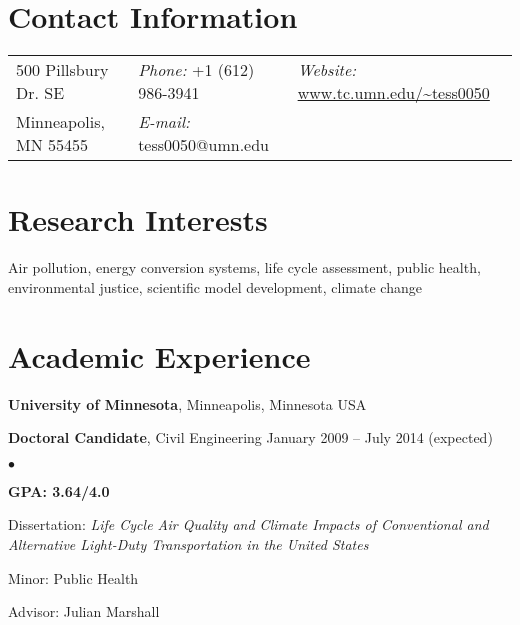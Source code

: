 \documentclass[margin,line]{res}
\newenvironment{list1}{
  \begin{list}{\ding{113}}{%
      \setlength{\itemsep}{0in}
      \setlength{\parsep}{0in} \setlength{\parskip}{0in}
      \setlength{\topsep}{0in} \setlength{\partopsep}{0in} 
      \setlength{\leftmargin}{0.17in}}}{\end{list}}
\newenvironment{list2}{
  \begin{list}{$\bullet$}{%
      \setlength{\itemsep}{0in}
      \setlength{\parsep}{0in} \setlength{\parskip}{0in}
      \setlength{\topsep}{0in} \setlength{\partopsep}{0in} 
      \setlength{\leftmargin}{0.2in}}}{\end{list}}
\begin{document}
\thispagestyle{empty}

\begin{resume}
\section{\sc Contact Information}
\vspace{.05in}
\begin{tabular}{@{}p{1.6in}p{1.7in}p{2.5in}}
500 Pillsbury Dr. SE	& 
{\it Phone:} +1 (612) 986-3941 & 
{\it Website:} \url{www.tc.umn.edu/~tess0050} \\            
Minneapolis, MN 55455		& 
{\it E-mail:}  tess0050@umn.edu & \\     		    
\end{tabular}

\section{\sc Research Interests}

Air pollution, energy conversion systems, life cycle assessment, public health, environmental justice, scientific model development, climate change

\vspace*{.1in}

\section{\sc Academic Experience}
\textbf{University of Minnesota}, Minneapolis, Minnesota USA\\

\vspace*{-.1in}

\begin{list1}
\item[] \textbf{Doctoral Candidate}, Civil Engineering \hfill January 2009 -- July 2014 (expected)\\
\begin{list2}
\vspace*{-.12in}
\item \textbf{GPA: 3.64/4.0}
\item Dissertation: \textit{Life Cycle Air Quality and Climate Impacts of Conventional and Alternative Light-Duty Transportation in the United States}
\item Minor: Public Health
\item Advisor:  Julian Marshall
\end{list2}


\end{list1}
\end{resume}
\end{document}
